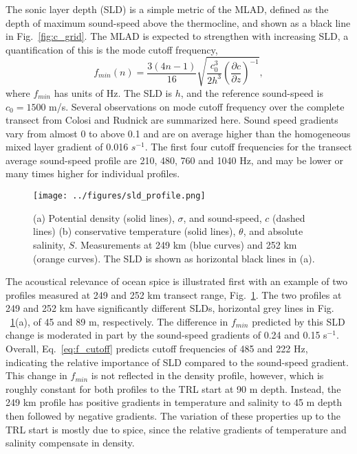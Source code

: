\documentclass[preprint,NumberedRefs]{JASA}
\begin{document}
The sonic layer depth (SLD) is a simple metric of the MLAD, defined as the depth of maximum sound-speed above the thermocline, and shown as a black line in Fig.~\ref{fig:c_grid}. The MLAD is expected to strengthen with increasing SLD, a quantification of this is the mode cutoff frequency\citep{Urick1982Prop},
\begin{equation}
    f_{min}(n) = \frac{3(4n-1)}{16} \sqrt{\frac{c_0^3}{2h^3} \left( \frac{\partial c}{\partial z} \right) ^ {-1}},
    \label{eq:f_cutoff}
\end{equation}
where $f_{min}$ has units of Hz. The SLD is $h$, and the reference sound-speed is $c_0 = 1500$ m/s. Several observations on mode cutoff frequency over the complete transect from Colosi and Rudnick\cite{colosi2020observations} are summarized here. Sound speed gradients vary from almost 0 to above 0.1 and are on average higher than the homogeneous mixed layer gradient of 0.016 $s^{-1}$. The first four cutoff frequencies for the transect average sound-speed profile are 210, 480, 760 and 1040 Hz, and may be lower or many times higher for individual profiles.

\begin{figure}
    \texttt{[image: ../figures/sld\_profile.png]}
    \caption{\label{fig:profiles}{(a) Potential density (solid lines), $\sigma$, and sound-speed, $c$ (dashed lines) (b) conservative temperature (solid lines), $\theta$, and absolute salinity, $S$. Measurements at 249 km (blue curves) and 252 km (orange curves). The SLD is shown as horizontal black lines in (a).}}
\end{figure}

The acoustical relevance of ocean spice is illustrated first with an example of two profiles measured at 249 and 252 km transect range, Fig.~\ref{fig:profiles}. The two profiles at 249 and 252 km have significantly different SLDs, horizontal grey lines in Fig. ~\ref{fig:profiles}(a), of 45 and 89 m, respectively. The difference in $f_{min}$ predicted by this SLD change is moderated in part by the sound-speed gradients of 0.24 and 0.15 s$^{-1}$. Overall, Eq.~\eqref{eq:f_cutoff} predicts cutoff frequencies of 485 and 222 Hz, indicating the relative importance of SLD compared to the sound-speed gradient. This change in $f_{min}$ is not reflected in the density profile, however, which is roughly constant for both profiles to the TRL start at 90 m depth. Instead, the 249 km profile has positive gradients in temperature and salinity to 45 m depth then followed by negative gradients. The variation of these properties up to the TRL start is mostly due to spice, since the relative gradients of temperature and salinity compensate in density.
\end{document}
